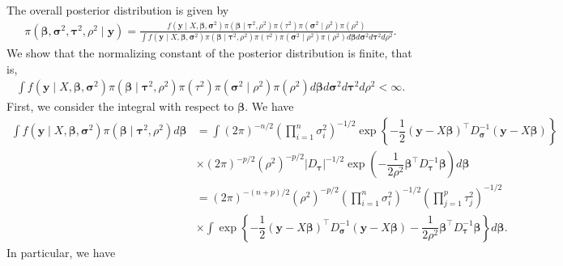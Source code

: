 \documentclass[11pt]{article}
\theoremstyle{plain}
\theoremstyle{definition}
\begin{document}
The overall posterior distribution is given by
\begin{align*}
\pi(\bm{\beta},\bm{\sigma}^{2},\bm{\tau}^{2},\rho^{2}\mid\bm{y})=\frac{f(\bm{y}\mid X,\bm{\beta},\bm{\sigma}^{2})\pi(\bm{\beta}\mid\bm{\tau}^{2},\rho^{2})\pi({\tau}^{2})\pi(\bm{\sigma}^{2}\mid\rho^{2})\pi(\rho^{2})}{\int f(\bm{y}\mid X,\bm{\beta},\bm{\sigma}^{2})\pi(\bm{\beta}\mid\bm{\tau}^{2},\rho^{2})\pi({\tau}^{2})\pi(\bm{\sigma}^{2}\mid\rho^{2})\pi(\rho^{2})d\bm{\beta}d\bm{\sigma}^{2}d\bm{\tau}^{2}d\rho^{2}}.
\end{align*}
We show that the normalizing constant of the posterior distribution is finite, that is, 
\begin{align*}
\int f(\bm{y}\mid X,\bm{\beta},\bm{\sigma}^{2})\pi(\bm{\beta}\mid\bm{\tau}^{2},\rho^{2})\pi({\tau}^{2})\pi(\bm{\sigma}^{2}\mid\rho^{2})\pi(\rho^{2})d\bm{\beta}d\bm{\sigma}^{2}d\bm{\tau}^{2}d\rho^{2}<\infty.
\end{align*}
First, we consider the integral with respect to $\bm{\beta}$. We have
\begin{align*}
\int f(\bm{y}\mid X,\bm{\beta},\bm{\sigma}^{2})\pi(\bm{\beta}\mid\bm{\tau}^{2},\rho^{2})d\bm\beta&=\int(2\pi)^{-n/2}\left(\prod_{i=1}^{n}\sigma_{i}^{2}\right)^{-1/2}\exp\left\{-\dfrac{1}{2}({\bm{y}}-X\bm\beta)^{\top}D_{\bm\sigma}^{-1}({\bm{y}}-X\bm\beta)\right\}\\
&\times (2\pi)^{-p/2}(\rho^{2})^{-p/2}|D_{\bm\tau}|^{-1/2}\exp\left(-\dfrac{1}{2\rho^{2}}\bm{\beta}^{\top}D_{\bm\tau}^{-1}\bm\beta\right)d\bm\beta\\
&=(2\pi)^{-(n+p)/2}(\rho^{2})^{-p/2}\left(\prod_{i=1}^{n}\sigma_{i}^{2}\right)^{-1/2}\left(\prod_{j=1}^{p}\tau_{j}^{2}\right)^{-1/2}\\
&\times \int\exp\left\{-\dfrac{1}{2}({\bm{y}}-X\bm\beta)^{\top}D_{\bm\sigma}^{-1}({\bm{y}}-X\bm\beta)-\dfrac{1}{2\rho^{2}}\bm{\beta}^{\top}D_{\bm\tau}^{-1}\bm\beta\right\}d\bm\beta.
\end{align*}
In particular, we have
\end{document}
